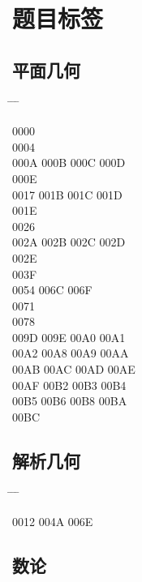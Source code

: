 \documentclass[twoside, twocolumn]{ctexart}
\newenvironment{problist}{
  \begin{center} \ttfamily \begin{tabbing}
      \hspace{50pt} \= \hspace{50pt} \= \hspace{50pt} \= \kill
  }{ \end{tabbing} \end{center} }
\begin{document}
  \balance

  \section*{题目标签}

  \subsection*{平面几何}

  \begin{problist}
    0000    \\ 0004    \\
    000A \> 000B \> 000C \> 000D \\ 000E    \\
    0017 \> 001B \> 001C \> 001D \\ 001E    \\
    0026    \\ 002A \> 002B \> 002C \> 002D \\
    002E    \\ 003F    \\
    0054  \> 006C \> 006F \\ 0071    \\
    0078    \\ 009D \> 009E \> 00A0 \> 00A1 \\
    00A2 \> 00A8 \> 00A9 \> 00AA \\ 00AB \> 00AC \> 00AD \> 00AE \\
    00AF \> 00B2 \> 00B3 \> 00B4 \\ 00B5 \> 00B6 \> 00B8 \> 00BA \\
    00BC \\
  \end{problist}

  \subsection*{解析几何}

  \begin{problist}
    0012  \> 004A \> 006E \\
  \end{problist}

  \subsection*{数论}
\end{document}
